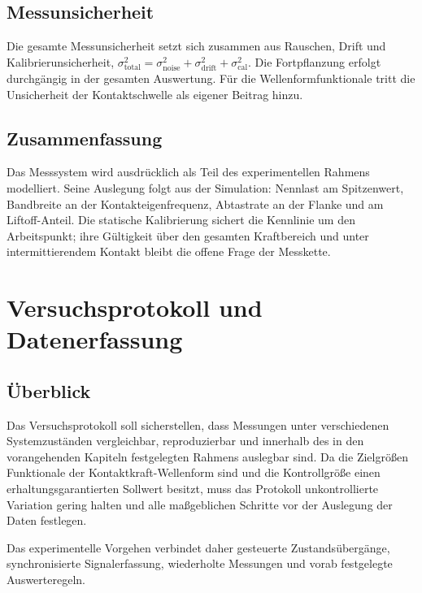 \documentclass[12pt,a4paper]{report}
\begin{document}
\section{Messunsicherheit}

Die gesamte Messunsicherheit setzt sich zusammen aus Rauschen, Drift
und Kalibrierunsicherheit,
$\sigma_{\text{total}}^2 = \sigma_{\text{noise}}^2 + \sigma_{\text{drift}}^2 + \sigma_{\text{cal}}^2$.
Die Fortpflanzung erfolgt durchgängig in der gesamten Auswertung. Für die
Wellenformfunktionale tritt die Unsicherheit der Kontaktschwelle als
eigener Beitrag hinzu.

\section{Zusammenfassung}

Das Messsystem wird ausdrücklich als Teil des experimentellen Rahmens
modelliert. Seine Auslegung folgt aus der Simulation: Nennlast am
Spitzenwert, Bandbreite an der Kontakteigenfrequenz, Abtastrate an der
Flanke und am Liftoff-Anteil. Die statische Kalibrierung sichert die
Kennlinie um den Arbeitspunkt; ihre Gültigkeit über den gesamten
Kraftbereich und unter intermittierendem Kontakt bleibt die offene
Frage der Messkette.


\chapter{Versuchsprotokoll und Datenerfassung}
\label{chap:protokoll}

\section{Überblick}

Das Versuchsprotokoll soll sicherstellen, dass Messungen unter
verschiedenen Systemzuständen vergleichbar, reproduzierbar und innerhalb
des in den vorangehenden Kapiteln festgelegten Rahmens auslegbar sind. Da
die Zielgrößen Funktionale der Kontaktkraft-Wellenform sind und die
Kontrollgröße einen erhaltungsgarantierten Sollwert besitzt, muss das
Protokoll unkontrollierte Variation gering halten und alle maßgeblichen
Schritte vor der Auslegung der Daten festlegen.

Das experimentelle Vorgehen verbindet daher gesteuerte
Zustandsübergänge, synchronisierte Signalerfassung, wiederholte Messungen
und vorab festgelegte Auswerteregeln.
\end{document}

